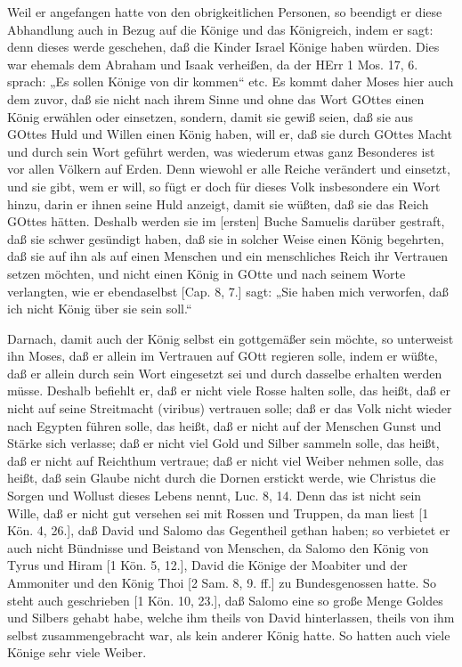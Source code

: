 Weil er angefangen hatte von den obrigkeitlichen Personen, so beendigt er diese Abhandlung auch in Bezug auf die Könige und das Königreich, indem er sagt: denn dieses werde geschehen, daß die Kinder Israel Könige haben würden. Dies war ehemals dem Abraham und Isaak verheißen, da der HErr 1 Mos. 17, 6. sprach: „Es sollen Könige von dir kommen“ etc. Es kommt daher Moses hier auch dem zuvor, daß sie nicht nach ihrem Sinne und ohne das Wort GOttes einen König erwählen oder einsetzen, sondern, damit sie gewiß seien, daß sie aus GOttes Huld und Willen einen König haben, will er, daß sie durch GOttes Macht und durch sein Wort geführt werden, was wiederum etwas ganz Besonderes ist vor allen Völkern auf Erden. Denn wiewohl er alle Reiche verändert und einsetzt, und sie gibt, wem er will, so fügt er doch für dieses Volk insbesondere ein Wort hinzu, darin er ihnen seine Huld anzeigt, damit sie wüßten, daß sie das Reich GOttes hätten. Deshalb werden sie im [ersten] Buche Samuelis darüber gestraft, daß sie schwer gesündigt haben, daß sie in solcher Weise einen König begehrten, daß sie auf ihn als auf einen Menschen und ein menschliches Reich ihr Vertrauen setzen möchten, und nicht einen König in GOtte und nach seinem Worte verlangten, wie er ebendaselbst [Cap. 8, 7.] sagt: „Sie haben mich verworfen, daß ich nicht König über sie sein soll.“

Darnach, damit auch der König selbst ein gottgemäßer sein möchte, so unterweist ihn Moses, daß er allein im Vertrauen auf GOtt regieren solle, indem er wüßte, daß er allein durch sein Wort eingesetzt sei und durch dasselbe erhalten werden müsse. Deshalb befiehlt er, daß er nicht viele Rosse halten solle, das heißt, daß er nicht auf seine Streitmacht (viribus) vertrauen solle; daß er das Volk nicht wieder nach Egypten führen solle, das heißt, daß er nicht auf der Menschen Gunst und Stärke sich verlasse; daß er nicht viel Gold und Silber sammeln solle,
das heißt, daß er nicht auf Reichthum vertraue; daß er nicht viel Weiber nehmen solle, das heißt, daß sein Glaube nicht durch die Dornen erstickt werde, wie Christus die Sorgen und Wollust dieses Lebens nennt, Luc. 8, 14. Denn das ist nicht sein Wille, daß er nicht gut versehen sei mit Rossen und Truppen, da man liest [1 Kön. 4, 26.], daß David und Salomo das Gegentheil gethan haben; so verbietet er auch nicht Bündnisse und Beistand von Menschen, da Salomo den König von Tyrus und Hiram [1 Kön. 5, 12.], David die Könige der Moabiter und der Ammoniter und den König Thoi [2 Sam. 8, 9. ff.] zu Bundesgenossen hatte. So steht auch geschrieben [1 Kön. 10, 23.], daß Salomo eine so große Menge Goldes und Silbers gehabt habe, welche ihm theils von David hinterlassen, theils von ihm selbst zusammengebracht war, als kein anderer König hatte. So hatten auch viele Könige sehr viele Weiber.

